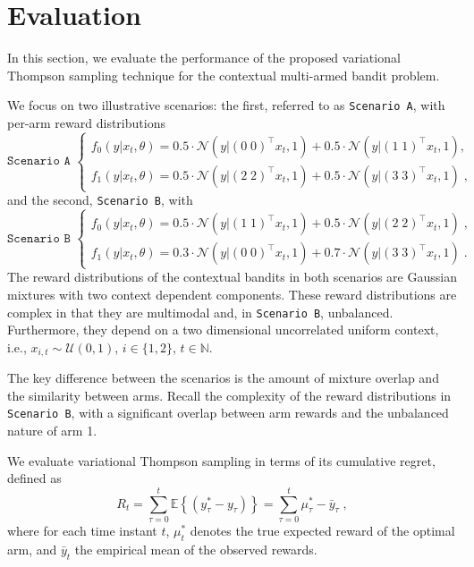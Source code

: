 \documentclass{article}
\def \Natural{{\mathbb N}}
\newcommand{\eValue}[1]{\mathbb{E}\left\{ #1 \right\}}
\newcommand{\ie}{i.e., }
\newcommand{\N}[1]{\mathcal{N}\left( #1\right)}
\newcommand{\U}[1]{\mathcal{U}\left( #1\right)}
\begin{document}
\section{Evaluation}
\label{sec:evaluation}

In this section, we evaluate the performance of the proposed variational Thompson sampling technique for the contextual multi-armed bandit problem.

We focus on two illustrative scenarios: the first, referred to as \texttt{Scenario A}, with per-arm reward distributions
\begin{equation}
\texttt{Scenario A }\begin{cases}
f_{0}(y|x_t,\theta) = 0.5 \cdot \N{y|(0 \; 0)^\top x_t , 1} + 0.5 \cdot \N{y|(1 \; 1)^\top x_t , 1},\\
f_{1}(y|x_t,\theta) = 0.5 \cdot \N{y|(2 \; 2)^\top x_t , 1} + 0.5 \cdot \N{y|(3 \; 3)^\top x_t , 1} \; ,
\end{cases}
\label{eq:scenario_A}
\end{equation}
and the second, \texttt{Scenario B}, with
\begin{equation}
\texttt{Scenario B }\begin{cases}
f_{0}(y|x_t,\theta) = 0.5 \cdot \N{y|(1 \; 1)^\top x_t , 1} + 0.5 \cdot \N{y|(2 \; 2)^\top x_t , 1} \; ,\\
f_{1}(y|x_t,\theta) = 0.3 \cdot \N{y|(0 \; 0)^\top x_t , 1} + 0.7 \cdot \N{y|(3 \; 3)^\top x_t , 1} \; .
\end{cases}
\label{eq:scenario_B}
\end{equation}
The reward distributions of the contextual bandits in both scenarios are Gaussian mixtures with two context dependent components.  These reward distributions are complex in that they are multimodal and, in \texttt{Scenario B}, unbalanced. Furthermore, they depend on a two dimensional uncorrelated uniform context, \ie $x_{i,t}\sim\U{0,1}$, $i\in\{1,2\}$, $t\in \Natural$.

The key difference between the scenarios is the amount of mixture overlap and the similarity between arms. Recall the complexity of the reward distributions in \texttt{Scenario B}, with a significant overlap between arm rewards and the unbalanced nature of arm 1.

We evaluate variational Thompson sampling in terms of its cumulative regret, defined as
\begin{equation}
R_t=\sum_{\tau=0}^t \eValue{\left(y^*_{\tau}-y_{\tau} \right)} = \sum_{\tau=0}^t \mu_\tau^*-\bar{y}_{\tau} \; ,
\end{equation}
where for each time instant $t$, $\mu_t^*$ denotes the true expected reward of the optimal arm, and $\bar{y}_{t}$ the empirical mean of the observed rewards.
\end{document}
